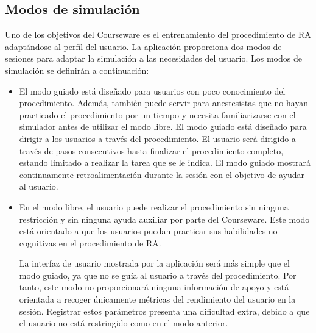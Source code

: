 


\subsection{Modos de simulación}
\label{course:modos}
Uno de los objetivos del \ac{Courseware} es el entrenamiento del procedimiento de \ac{RA} adaptándose al perfil del usuario. La aplicación proporciona dos modos de sesiones para adaptar la simulación a las necesidades del usuario. Los modos de simulación se definirán a continuación:

\begin{itemize}
    \item El modo guiado está diseñado para usuarios con poco conocimiento del procedimiento. Además, también puede servir para anestesistas que no hayan practicado el procedimiento por un tiempo y necesita familiarizarse con el simulador antes de utilizar el modo libre. %
El modo guiado está diseñado para dirigir a los usuarios a través del procedimiento. El usuario será dirigido a través de pasos consecutivos hasta finalizar el procedimiento completo, estando limitado a realizar la tarea que se le indica. El modo guiado mostrará continuamente retroalimentación durante la sesión con el objetivo de ayudar al usuario.%

\item En el modo libre, el usuario puede realizar el procedimiento sin ninguna restricción y sin ninguna ayuda auxiliar por parte del \ac{Courseware}. Este modo está orientado a que los usuarios puedan practicar sus habilidades no cognitivas en el procedimiento de \ac{RA}. 

La interfaz de usuario mostrada por la aplicación será más simple que el modo guiado, ya que no se guía al usuario a través del procedimiento. Por tanto, este modo no proporcionará ninguna información de apoyo y está orientada a recoger únicamente métricas del rendimiento del usuario en la sesión. Registrar estos parámetros presenta una dificultad extra, debido a que el usuario no está restringido como en el modo anterior. %

\end{itemize}

